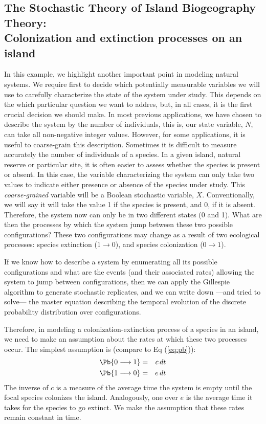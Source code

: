 \subsection{The Stochastic Theory of Island Biogeography Theory: \\
Colonization and extinction processes on an island}
In this example, we highlight another important point in modeling natural systems. We require first to decide which potentially measurable variables we will use to carefully characterize the state of the system under study. This depends on the which particular question we want to addres, but, in all cases, it is the first crucial decision we should make. In most previous applications, we have chosen to describe the system by the number of individuals, this is, our state variable, $N$, can take all non-negative integer values. However, for some applications, it is useful to coarse-grain this description. Sometimes it is difficult to measure accurately the number of individuals of a species. In a given island, natural reserve or particular site, it is often easier to assess whether the species is present or absent. In this case, the variable characterizing the system can only take two values to indicate either presence or absence of the species under study. This {\it coarse-grained} variable will be a Boolean stochastic variable, $X$. Conventionally, we will say it will take the value 1 if the species is present, and 0, if it is absent. Therefore, the system now can only be in two different states (0 and 1). What are then the processes by which the system jump between these two possible configurations?  These two configurations may change as a result of two ecological processes: species extinction ($1 \rightarrow 0$), and species colonization ($0 \rightarrow 1$). 
\smallskip

If we know how to describe a system by enumerating all its possible configurations and what are the events (and their associated rates) allowing the system to jump between configurations, then we can apply the Gillespie algorithm to generate stochastic replicates, and we can write down ---and tried to solve--- the master equation describing the temporal evolution of the discrete probability distribution over configurations.
\smallskip

Therefore, in modeling a colonization-extinction process of a species in an island, we need to make an assumption about the rates at which these two processes occur. The simplest assumption is (compare to Eq (\ref{eq:pb})):
\begin{eqnarray}
\Pb\{ 0 \longrightarrow 1 \} & = & c\,dt \nonumber\\
\Pb\{ 1 \longrightarrow 0 \} & = & e\,dt
\label{eq:c-e}
\end{eqnarray}
The inverse of $c$ is a measure of the average time the system is empty until the focal species colonizes the island. Analogously, one over $e$ is the average time it takes for the species to go extinct. We make the assumption that these rates remain constant in time. 
\smallskip

